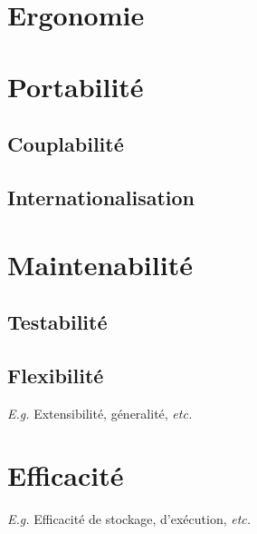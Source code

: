 \section{Ergonomie}

\section{Portabilité}
\subsection{Couplabilité}
\subsection{Internationalisation}

\section{Maintenabilité}
\subsection{Testabilité}
\subsection{Flexibilité}
\textsl{E.g.} Extensibilité, géneralité, \textsl{etc.}

\section{Efficacité}
\textsl{E.g.} Efficacité de stockage, d'exécution, \textsl{etc.}
